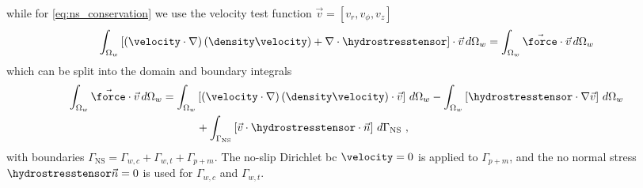 %
while for \cref{eq:ns_conservation} we use the velocity test function $\vec{v}=\left[v_r, v_\phi, v_z\right]$
%
\begin{align}
  \displaystyle\int_{\Omega_w}
  \left[
    \left( \velocity \cdot \nabla \right) \left( \density\velocity \right) + \nabla \cdot \hydrostresstensor
  \right]
  \cdot \vec{v} \,d\Omega_w
  =
  \displaystyle\int_{\Omega_w} \vec{\force} \cdot \vec{v} \,d\Omega_w 
\end{align}
%
which can be split into the domain and boundary integrals
%
\begin{align}
  \displaystyle\int_{\Omega_w} \vec{\force} \cdot \vec{v} \,d\Omega_w =
  \displaystyle\int_{\Omega_w} &
  \left[
    \left( \velocity \cdot \nabla \right) \left( \density\velocity \right) \cdot\vec{v}
  \right] 
  \,d\Omega_w 
  -
  \displaystyle\int_{\Omega_w}
  \left[
  \hydrostresstensor \cdot \nabla\vec{v}
  \right]
  \,d\Omega_w \notag \\
  & +
  \displaystyle\int_{\Gamma_\text{NS}}
  \left[
  \vec{v} \cdot
  \hydrostresstensor
  \cdot\vec{n}
  \right]
  \,d\Gamma_\text{NS}
  \text{ ,}
\end{align}
%
with boundaries $\Gamma_\text{NS} = \Gamma_{w,c}+\Gamma_{w,t}+\Gamma_{p+m}$. The no-slip Dirichlet \gls{bc}
$\velocity = 0$ is applied to $\Gamma_{p+m}$, and the no normal stress $\hydrostresstensor\vec{n}=0$ is used
for $\Gamma_{w,c}$ and $\Gamma_{w,t}$.




\cleardoublepage

